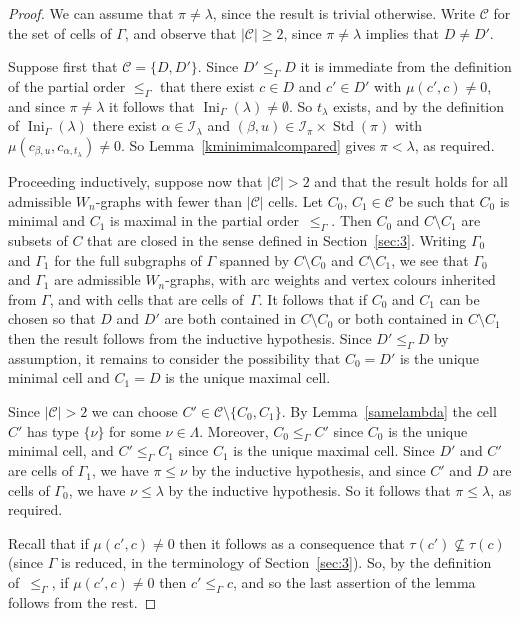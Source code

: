 \documentclass[10pt]{amsart}
\theoremstyle{definition}
\DeclareMathOperator{\Ini}{Ini}
\DeclareMathOperator{\STD}{Std}
\begin{document}
\begin{proof}
We can assume that $\pi\neq\lambda$, since the result is trivial otherwise.
Write $\mathcal{C}$ for the set of cells of $\Gamma$, and observe that
$|\mathcal{C}|\geqslant 2$, since $\pi\neq\lambda$ implies that $D\ne D'$.

Suppose first that $\mathcal{C}=\{D,D'\}$. Since $D'\leqslant_{\Gamma} D$
it is immediate from the definition of the partial order $\leqslant_{\Gamma}$
that there exist $c\in D$ and $c'\in D'$ with $\mu(c',c) \neq 0$, and
since $\pi\ne\lambda$ it follows that $\Ini_\Gamma(\lambda)\ne\emptyset$.
So $t_\lambda$ exists, and by the definition of $\Ini_\Gamma(\lambda)$
there exist $\alpha\in\mathcal{I}_\lambda$ and
$(\beta,u)\in\mathcal{I}_\pi\times\STD(\pi)$ with
$\mu(c_{\beta,u},c_{\alpha,t_\lambda})\ne 0$.
So Lemma~\ref{kminimimalcompared} gives $\pi<\lambda$, as required.

Proceeding inductively, suppose now that $|\mathcal{C}|>2$ and that the result
holds for all admissible $W_n$-graphs with fewer than $|\mathcal{C}|$ cells.
Let $C_0,\,C_1\in\mathcal{C}$ be such that $C_0$ is minimal and $C_1$
is maximal in the partial order~$\leqslant_{\Gamma}$. Then $C_0$ and
$C\setminus C_1$ are subsets of $C$ that are closed in the sense defined
in Section~\ref{sec:3}. Writing $\Gamma_0$ and $\Gamma_1$ for the full
subgraphs of $\Gamma$ spanned by $C\setminus C_0$ and $C\setminus C_1$,
we see that $\Gamma_0$ and $\Gamma_1$ are admissible $W_n$-graphs, with
arc weights and vertex colours inherited from $\Gamma$, and with cells
that are cells of~$\Gamma$. It follows that if $C_0$ and $C_1$ can be
chosen so that $D$ and $D'$ are both contained in $C\setminus C_0$ or both
contained in $C\setminus C_1$ then the result follows from the inductive
hypothesis. Since $D'\leqslant_{\Gamma} D$ by assumption, it remains to
consider the possibility that $C_0=D'$ is the unique minimal cell and
$C_1=D$ is the unique maximal cell.

Since $|\mathcal{C}|>2$ we can choose $C'\in\mathcal{C}\setminus\{C_0,C_1\}$.
By Lemma~\ref{samelambda} the cell $C'$ has type $\{\nu\}$ for some
$\nu\in\Lambda$. Moreover, $C_0\leqslant_{\Gamma} C'$ since $C_0$ is the
unique minimal cell, and $C'\leqslant_{\Gamma}C_1$ since $C_1$ is the
unique maximal cell. Since $D'$ and $C'$ are cells of $\Gamma_1$, we have
$\pi\leqslant\nu$ by the inductive hypothesis, and since
$C'$ and $D$ are cells of $\Gamma_0$, we have $\nu\leqslant\lambda$
by the inductive hypothesis. So it follows that $\pi\leq\lambda$, as required.

Recall that if $\mu(c',c)\ne0$ then it follows as a consequence that
$\tau(c')\nsubseteq\tau(c)$ (since $\Gamma$ is reduced, in the
terminology of Section~\ref{sec:3}). So, by the definition of~$\leqslant_{\Gamma}$,
if $\mu(c',c)\ne0$ then $c'\leqslant_{\Gamma}c$, and so the last
assertion of the lemma follows from the rest.
\end{proof}
\end{document}
